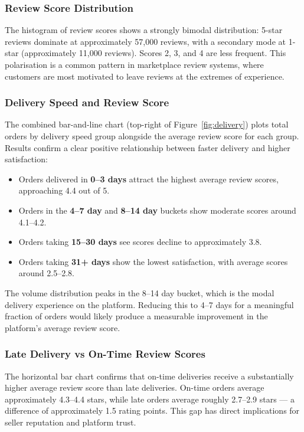 \documentclass[12pt,a4paper]{article}
\begin{document}
\subsubsection{Review Score Distribution}

The histogram of review scores shows a strongly bimodal distribution: 5-star reviews
dominate at approximately 57,000 reviews, with a secondary mode at 1-star (approximately
11,000 reviews). Scores 2, 3, and 4 are less frequent. This polarisation is a common
pattern in marketplace review systems, where customers are most motivated to leave reviews
at the extremes of experience.

\subsubsection{Delivery Speed and Review Score}

The combined bar-and-line chart (top-right of Figure~\ref{fig:delivery}) plots total orders
by delivery speed group alongside the average review score for each group. Results confirm
a clear positive relationship between faster delivery and higher satisfaction:

\begin{itemize}
    \item Orders delivered in \textbf{0--3 days} attract the highest average review scores,
          approaching 4.4 out of 5.
    \item Orders in the \textbf{4--7 day} and \textbf{8--14 day} buckets show moderate
          scores around 4.1--4.2.
    \item Orders taking \textbf{15--30 days} see scores decline to approximately 3.8.
    \item Orders taking \textbf{31+ days} show the lowest satisfaction, with average scores
          around 2.5--2.8.
\end{itemize}

The volume distribution peaks in the 8--14 day bucket, which is the modal delivery
experience on the platform. Reducing this to 4--7 days for a meaningful fraction of orders
would likely produce a measurable improvement in the platform's average review score.

\subsubsection{Late Delivery vs On-Time Review Scores}

The horizontal bar chart confirms that on-time deliveries receive a substantially higher
average review score than late deliveries. On-time orders average approximately 4.3--4.4
stars, while late orders average roughly 2.7--2.9 stars — a difference of approximately 1.5
rating points. This gap has direct implications for seller reputation and platform trust.
\end{document}
